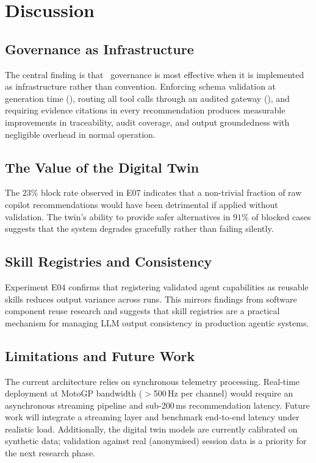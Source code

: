 \section{Discussion}
\label{sec:discussion}

\subsection{Governance as Infrastructure}

The central finding is that \kdd~governance is most effective when it is
implemented as infrastructure rather than convention. Enforcing schema
validation at generation time (\sdd), routing all tool calls through an
audited gateway (\mcp), and requiring evidence citations in every recommendation
produces measurable improvements in traceability, audit coverage, and output
groundedness with negligible overhead in normal operation.

\subsection{The Value of the Digital Twin}

The $23\%$ block rate observed in E07 indicates that a non-trivial fraction of
raw copilot recommendations would have been detrimental if applied without
validation. The twin's ability to provide safer alternatives in $91\%$ of blocked
cases suggests that the system degrades gracefully rather than failing silently.

\subsection{Skill Registries and Consistency}

Experiment E04 confirms that registering validated agent capabilities as reusable
skills reduces output variance across runs. This mirrors findings from software
component reuse research and suggests that skill registries are a practical
mechanism for managing LLM output consistency in production agentic systems.

\subsection{Limitations and Future Work}

The current architecture relies on synchronous telemetry processing. Real-time
deployment at MotoGP bandwidth ($>$500\,Hz per channel) would require an
asynchronous streaming pipeline and sub-200\,ms recommendation latency. Future
work will integrate a streaming layer and benchmark end-to-end latency under
realistic load. Additionally, the digital twin models are currently calibrated
on synthetic data; validation against real (anonymised) session data is a
priority for the next research phase.
